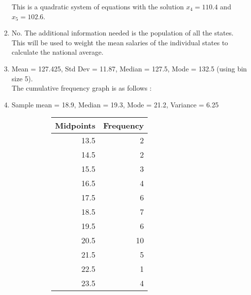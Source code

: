 \begin{enumerate}
		This is a quadratic system of equations with the solution $ x_4 = 110.4 $ and $ x_5 = 102.6 $. \\
	
	
	\item No. The additional information needed is the population of all the states. This will be used to weight the mean salaries of the individual states to calculate the national average.
	
	\item Mean = 127.425, Std Dev = 11.87, Median = 127.5, Mode = 132.5 (using bin size 5). \\
	The cumulative frequency graph is as follows : 
	
	
	\item Sample mean = 18.9, Median = 19.3, Mode = 21.2, Variance =  6.25\\
	\begin{figure}[H]
		\centering
		
	\end{figure}
	
	\begin{figure}[H]
		\begin{subfigure}[]{0.45\linewidth}
			\centering
			\begin{table}[H]
				\centering
				\begin{tabular}{rr}
					\toprule
					Midpoints &  Frequency \\
					\midrule
					13.5 &          2 \\
					14.5 &          2 \\
					15.5 &          3 \\
					16.5 &          4 \\
					17.5 &          6 \\
					18.5 &          7 \\
					19.5 &          6 \\
					20.5 &         10 \\
					21.5 &          5 \\
					22.5 &          1 \\
					23.5 &          4 \\
					\bottomrule
				\end{tabular}
			\end{table}
		\end{subfigure}
		\begin{subfigure}[]{0.45\linewidth}
			\centering
		\end{subfigure} \\		
	\end{figure}
	

\end{enumerate}
